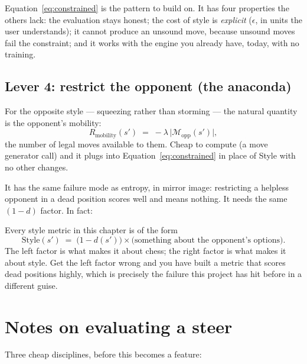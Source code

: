 \begin{keyidea}
Equation~\eqref{eq:constrained} is the pattern to build on. It has four properties the others
lack: the evaluation stays honest; the cost of style is \emph{explicit} ($\epsilon$, in units
the user understands); it cannot produce an unsound move, because unsound moves fail the
constraint; and it works with the engine you already have, today, with no training.
\end{keyidea}

\subsection{Lever 4: restrict the opponent (the anaconda)}

For the opposite style --- squeezing rather than storming --- the natural quantity is the
opponent's mobility:
\[
  R_{\text{mobility}}(s') \;=\; -\lambda\,\bigl|\mathcal{M}_{\text{opp}}(s')\bigr| ,
\]
the number of legal moves available to them. Cheap to compute (a move generator call) and it
plugs into Equation~\eqref{eq:constrained} in place of Style with no other changes.

It has the same failure mode as entropy, in mirror image: restricting a helpless opponent in a
dead position scores well and means nothing. It needs the same $(1-d)$ factor. In fact:

\begin{keyidea}
Every style metric in this chapter is of the form
\[
  \text{Style}(s') \;=\; \bigl(1 - d(s')\bigr) \times \bigl(\text{something about the
  opponent's options}\bigr) .
\]
The left factor is what makes it about chess; the right factor is what makes it about style.
Get the left factor wrong and you have built a metric that scores dead positions highly, which
is precisely the failure this project has hit before in a different guise.
\end{keyidea}

\section{Notes on evaluating a steer}

Three cheap disciplines, before this becomes a feature:


